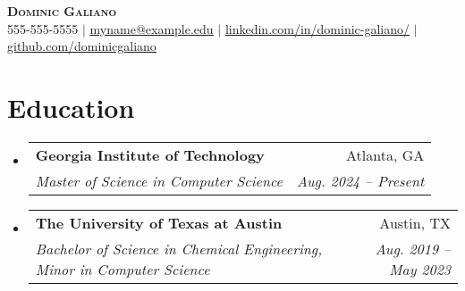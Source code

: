 \documentclass[letterpaper,11pt]{article}
\makeatletter
\newcommand{\resumeSubheading}[4]{
  \vspace{-2pt}\item
    \begin{tabular*}{0.97\textwidth}[t]{l@{\extracolsep{\fill}}r}
      \textbf{#1} & #2 \\
      \textit{\small#3} & \textit{\small #4} \\
    \end{tabular*}\vspace{-7pt}
}
\newcommand{\resumeSubHeadingListStart}{\begin{itemize}[leftmargin=0.15in, label={}]}
\newcommand{\resumeSubHeadingListEnd}{\end{itemize}}
\makeatother
\begin{document}

\begin{center}
    \textbf{\Huge \scshape Dominic Galiano} \\ \vspace{1pt}
    \small 555-555-5555 $|$ \href{mailto:myname@example.edu}{\underline{myname@example.edu}} $|$ 
    \href{https://linkedin.com/in/dominic-galiano/}{\underline{linkedin.com/in/dominic-galiano/}} $|$
    \href{https://github.com/dominicgaliano}{\underline{github.com/dominicgaliano}}
\end{center}


\section{Education}
  \resumeSubHeadingListStart
    \resumeSubheading
      {Georgia Institute of Technology}{Atlanta, GA}
      {Master of Science in Computer Science}{Aug. 2024 -- Present}
    \resumeSubheading
      {The University of Texas at Austin}{Austin, TX}
      {Bachelor of Science in Chemical Engineering, Minor in Computer Science}{Aug. 2019 -- May 2023}
  \resumeSubHeadingListEnd


\end{document}
